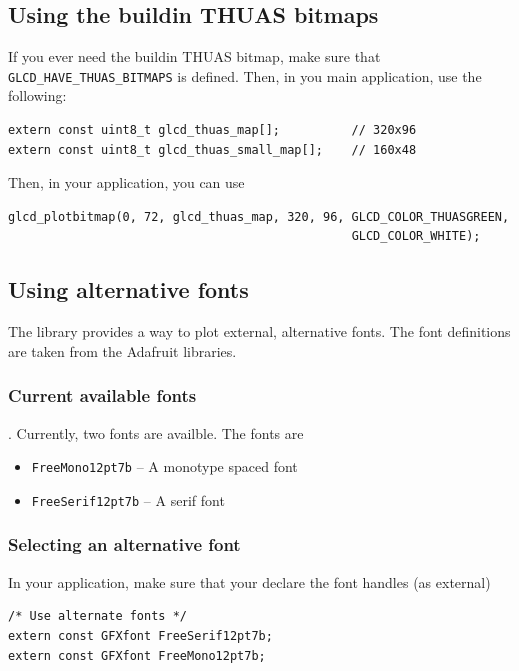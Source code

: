 \documentclass[12pt]{article}
\begin{document}
\subsection{Using the buildin THUAS bitmaps}
If you ever need the buildin THUAS bitmap, make sure that \lstinline|GLCD_HAVE_THUAS_BITMAPS| is defined. Then, in you main application, use the following:

\begin{lstlisting}
extern const uint8_t glcd_thuas_map[];          // 320x96
extern const uint8_t glcd_thuas_small_map[];    // 160x48
\end{lstlisting}

Then, in your application, you can use

\begin{lstlisting}
glcd_plotbitmap(0, 72, glcd_thuas_map, 320, 96, GLCD_COLOR_THUASGREEN,
                                                GLCD_COLOR_WHITE);
\end{lstlisting}

\subsection{Using alternative fonts}
\label{sec:usealtfonts}
The library provides a way to plot external, alternative fonts. The font definitions are taken from the Adafruit libraries.

\subsubsection{Current available fonts}.
Currently, two fonts are availble. The fonts are

\begin{itemize}
\item \lstinline|FreeMono12pt7b|  -- A monotype spaced font
\item \lstinline|FreeSerif12pt7b| -- A serif font
\end{itemize}

\subsubsection{Selecting an alternative font}
In your application, make sure that your declare the font handles (as external)

\begin{lstlisting}
/* Use alternate fonts */
extern const GFXfont FreeSerif12pt7b;
extern const GFXfont FreeMono12pt7b;
\end{lstlisting}
\end{document}
